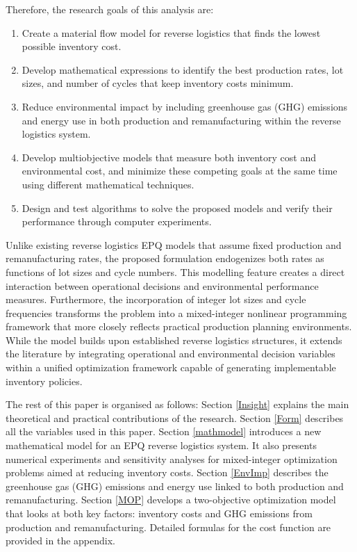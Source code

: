 \documentclass[11pt]{article}
\begin{document}
\noindent Therefore, the research goals of this analysis are:
\begin{enumerate}
    \item Create a material flow model for reverse logistics that finds the lowest possible inventory cost.
    \item Develop mathematical expressions to identify the best production rates, lot sizes, and number of cycles that keep inventory costs minimum.
    \item Reduce environmental impact by including greenhouse gas (GHG) emissions and energy use in both production and remanufacturing within the reverse logistics system.
    \item Develop multiobjective models that measure both inventory cost and environmental cost, and minimize these competing goals at the same time using different mathematical techniques.
    \item Design and test algorithms to solve the proposed models and verify their performance through computer experiments.
\end{enumerate}

\noindent Unlike existing reverse logistics EPQ models that assume fixed production and remanufacturing rates, the proposed formulation endogenizes both rates as functions of lot sizes and cycle numbers. This modelling feature creates a direct interaction between operational decisions and environmental performance measures. Furthermore, the incorporation of integer lot sizes and cycle frequencies transforms the problem into a mixed-integer nonlinear programming framework that more closely reflects practical production planning environments. While the model builds upon established reverse logistics structures, it extends the literature by integrating operational and environmental decision variables within a unified optimization framework capable of generating implementable inventory policies.

\noindent The rest of this paper is organised as follows: Section \ref{Insight} explains the main theoretical and practical contributions of the research. Section \ref{Form} describes all the variables used in this paper. Section \ref{mathmodel} introduces a new mathematical model for an EPQ reverse logistics system. It also presents numerical experiments and sensitivity analyses for mixed-integer optimization problems aimed at reducing inventory costs. Section \ref{EnvImp} describes the greenhouse gas (GHG) emissions and energy use linked to both production and remanufacturing. Section \ref{MOP} develops a two-objective optimization model that looks at both key factors: inventory costs and GHG emissions from production and remanufacturing. Detailed formulas for the cost function  are provided in the appendix.
\end{document}
